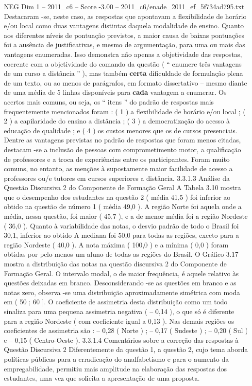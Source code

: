 \begin{textsample}{NEG Dim 1 – 2011\_c6 – Score -3.00 – 2011\_c6/enade\_2011\_ef\_5f734ad795.txt}
Destacaram -se, neste caso, as respostas que apontavam a flexibilidade de horário e/ou local como duas vantagens distintas daquela modalidade de ensino.
Quanto aos diferentes níveis de pontuação previstos, a maior causa de baixas pontuações foi a ausência de justificativas, e mesmo de argumentação, para uma ou mais das vantagens enumeradas.
Isso demonstra não apenas a objetividade das respostas, coerente com a objetividade do comando da questão ( “ enumere três vantagens de um curso a distância ” ), mas também \textbf{certa} dificuldade de formulação plena de um texto, ou ao menos de parágrafos, em formato dissertativo – mesmo diante de uma média de 5 linhas disponíveis para \textbf{cada} vantagem a enumerar.
Os acertos mais comuns, ou seja, os “ itens ” do padrão de respostas mais frequentemente mencionados foram : ( 1 ) a flexibilidade de horário e/ou local ; ( 2 ) a capilaridade do ensino a distância ; ( 3 ) a democratização do acesso à educação de qualidade ; e ( 4 ) os custos menores que os de cursos presenciais.
Dentre as vantagens previstas no padrão de respostas que foram menos citadas, destacam -se a inclusão de pessoas com comprometimento motor, a qualificação de professores e a troca de experiências entre os participantes.
Foram muito comuns, no entanto, as menções à supostamente maior facilidade de acesso a professores ou/e tutores em cursos superiores a distância. 3.3.1.3 Análise da Questão Discursiva 2 do Componente de Formação Geral A Tabela 3.10 mostra que o desempenho dos estudantes na questão 2 ( média 41,5 ) foi inferior ao obtido na questão de número 1 ( média 49,0 ).
A região Norte foi aquela onde a média, nessa questão, foi maior ( 45,7 ), e a de menor média foi a região Nordeste ( 36,0 ).
Quanto à variabilidade das notas, o desvio padrão de todo o Brasil foi 30,1, inferior ao obtido A mediana foi 50,0 para todas as regiões, exceto para a região Nordeste ( 40,0 ).
A nota máxima ( 100,0 ) e a mínima ( 0,0 ) foram obtidas por pelo menos um aluno de todas as regiões do Brasil.
O Gráfico 3.17 mostra a distribuição das notas na questão discursiva 2 do Componente de Formação Geral.
O intervalo modal, o de maior frequência, é aquele relativo às questões deixadas em branco.
Desconsiderando -se as questões em branco e as notas zero, observa -se uma distribuição aproximadamente simétrica com moda em ( 50 ; 60 ].
O coeficiente de assimetria desta distribuição como um todo sinaliza para uma pequena assimetria negativa ( – 0,14 ), o que só é diferente para a região Nordeste ( com coeficiente igual a 0,13 ).
Nas demais regiões os coeficientes de assimetria são : – 0,28 ( Norte ) ; – 0,17 ( Sudeste ) ; – 0,20 ( Sul ) e – 0,15 ( Centro-Oeste ). 3.3.1.4 Comentários sobre a correção das respostas à Questão Discursiva 2 Diferentemente da questão 1, a questão 2, cujo tema aborda políticas públicas para a erradicação do analfabetismo e para o aumento da empregabilidade, permitiu mais amplitude na elaboração das respostas dos estudantes, uma vez que solicita a apresentação de uma proposta.

\end{textsample}
